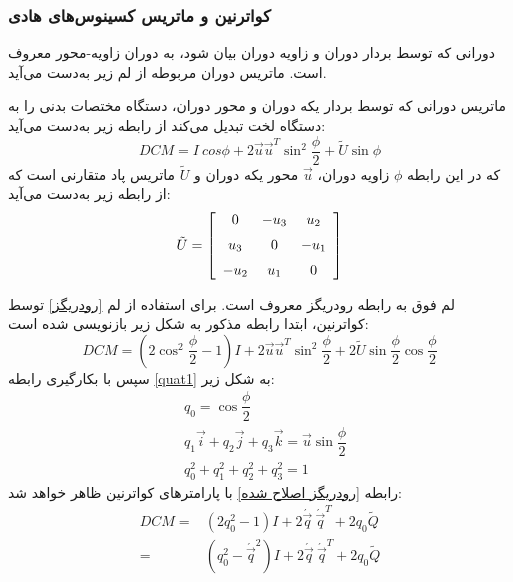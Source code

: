 \subsubsection{کواترنین و ماتریس کسینوس‌های هادی}
دورانی که توسط بردار دوران و زاویه دوران بیان شود، به دوران زاویه-محور
 معروف است. ماتریس دوران مربوطه از لم زیر به‌دست می‌آید.
\begin{lemma} \label{رودریگز}
ماتریس دورانی که توسط بردار یکه دوران و محور دوران، دستگاه مختصات بدنی را به دستگاه لخت تبدیل می‌کند از رابطه زیر به‌دست می‌آید:{\cite{jazar2011advanced}}
\begin{equation}
DCM=I \ cos{\phi}+2\vec{u}\vec{u}^T\sin^2{\dfrac{\phi}{2}}+\tilde{U}\sin{\phi}
\end{equation}
که در این رابطه $ \phi $ زاویه دوران، $ \vec{u} $ محور یکه دوران و $\tilde{U}$  ماتریس پاد متقارنی است که از رابطه زیر به‌دست می‌آید:
\begin{equation}
\tilde{U}= \left[ \begin {array}{ccc} 0&-u_{3}&u_{2}\\ \noalign{\medskip}u_{3}&0
&-u_{1}\\ \noalign{\medskip}-u_{2}&u_{1}&0\end {array} \right]
\end{equation}
\end{lemma}
لم فوق به رابطه رودریگز معروف است. 
برای استفاده از لم \eqref{رودریگز} توسط کواترنین، ابتدا رابطه مذکور به شکل زیر بازنویسی شده است:
\begin{equation} \label{رودریگز اصلاح شده}
DCM=(2\cos^2{\dfrac{\phi}{2}}-1)I+2\vec{u}\vec{u}^T\sin^2{\dfrac{\phi}{2}}+2\tilde{U}\sin{\dfrac{\phi}{2}}\cos{\dfrac{\phi}{2}}
\end{equation}
سپس با بکارگیری رابطه \eqref{quat1} به شکل زیر:
\begin{equation}
\begin{split}
& q_0=\cos{\dfrac{\phi}{2}}\\
& q_1\vec{i}+q_2\vec{j}+q_3\vec{k}=\vec{u}\sin{\dfrac{\phi}{2}}\\
& q_0^2+q_1^2+q_2^2+q_3^2=1
\end{split}
\end{equation}
 رابطه \eqref{رودریگز اصلاح شده} با پارامترهای کواترنین ظاهر خواهد شد:
\begin{equation} \label{رودریگز-کواترنین}
\begin{split}
DCM=	&(2q_0^2-1) I+2\acute{\vec{q}} \ \acute{\vec{q}}^T+2q_0\tilde{Q}\\
			=&(q_0^2-{\acute{\vec{q}}}^2) I+2\acute{\vec{q}} \ \acute{\vec{q}}^T+2q_0\tilde{Q}
\end{split}
\end{equation}
